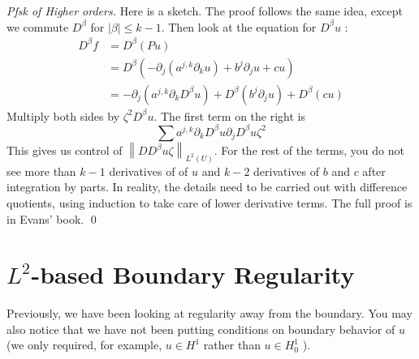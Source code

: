 \begin{proof}[Pfsk of Higher orders]
 Here is a sketch. The proof follows the same idea, except we commute $D^{\beta}$ for $|\beta| \leq k-1$. Then look at the equation for $D^{\beta} u$ :
$$
\begin{aligned}
D^{\beta} f&=D^{\beta}(P u)\\ 
&=D^{\beta}\left(-\partial_{j}\left(a^{j, k} \partial_{k} u\right)+b^{j} \partial_{j} u+c u\right) \\
&=-\partial_{j}\left(a^{j, k} \partial_{k} D^{\beta} u\right)+D^{\beta}\left(b^{j} \partial_{j} u\right)+D^{\beta}(c u)
\end{aligned}
$$
Multiply both sides by $\zeta^{2} D^{\beta} u$. The first term on the right is
$$
\sum a^{j,k} \partial_k D^\beta u \partial_j D^\beta u \zeta^2 
$$
This gives us control of $\left\|D D^{\beta} u \zeta\right\|_{L^{2}(U)}$. For the rest of the terms, you do not see more than $k-1$ derivatives of of $u$ and $k-2$ derivatives of $b$ and $c$ after integration by parts.
In reality, the details need to be carried out with difference quotients, using induction to take care of lower derivative terms. The full proof is in Evans' book.
\qed
\end{proof}




\newpage
\section{$L^2$-based Boundary Regularity}
Previously, we have been looking at regularity away from the boundary. You may also notice that we have not been putting conditions on boundary behavior of $u$ (we only required, for example, $u \in H^{1}$ rather than $u \in H_{0}^{1}$ ).


